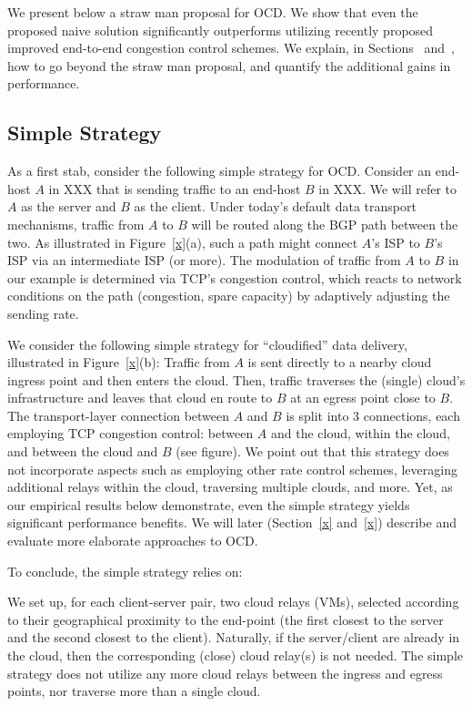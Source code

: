 \documentclass[sigconf,usenames,dvipsnames,geometry]{acmart}
\begin{document}
We present below a straw man proposal for OCD. We show that even the proposed naive solution significantly outperforms utilizing recently proposed improved end-to-end congestion control schemes. We explain, in Sections~\cite{x} and~\cite{x}, how to go beyond the straw man proposal, and quantify the additional gains in performance.

\subsection{Simple Strategy}

As a first stab, consider the following simple strategy for OCD. Consider an end-host $A$ in XXX that is sending traffic to an end-host $B$ in XXX. We will refer to $A$ as the server and $B$ as the client. Under today's default data transport mechanisms, traffic from $A$ to $B$ will be routed along the BGP path between the two. As illustrated in Figure~\ref{x}(a), such a path might connect $A$'s ISP to $B$'s ISP via an intermediate ISP (or more). The modulation of traffic from $A$ to $B$ in our example is determined via TCP's congestion control, which reacts to network conditions on the path (congestion, spare capacity) by adaptively adjusting the sending rate.

We consider the following simple strategy for ``cloudified'' data delivery, illustrated in Figure~\ref{x}(b): Traffic from $A$ is sent directly to a nearby cloud ingress point and then enters the cloud. Then, traffic traverses the (single) cloud's infrastructure and leaves that cloud en route to $B$ at an egress point close to $B$. The transport-layer connection between $A$ and $B$ is split into $3$ connections, each employing TCP congestion control: between $A$ and the cloud, within the cloud, and between the cloud and $B$ (see figure). We point out that this strategy does not incorporate aspects such as employing other rate control schemes, leveraging additional relays within the cloud, traversing multiple clouds, and more. Yet, as our empirical results below demonstrate, even the simple strategy yields significant performance benefits. We will later (Section~\ref{x} and~\ref{x}) describe and evaluate more elaborate approaches to OCD.

To conclude, the simple strategy relies on:

\vspace{0.1in} We set up, for each client-server pair, two cloud relays (VMs), selected according to their geographical proximity to the end-point (the first closest to the server and the second closest to the client). Naturally, if the server/client are already in the cloud, then the corresponding (close) cloud relay(s) is not needed. The simple strategy does not utilize any more cloud relays between the ingress and egress points, nor traverse more than a single cloud.
\end{document}
